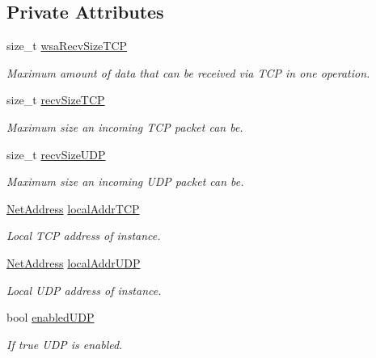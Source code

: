 \subsection*{Private Attributes}
\begin{DoxyCompactItemize}
\item 
size\_\-t \hyperlink{class_net_instance_profile_ad83ca6291444ecb7e1138f336952afc7}{wsaRecvSizeTCP}
\begin{DoxyCompactList}\small\item\em Maximum amount of data that can be received via TCP in one operation. \item\end{DoxyCompactList}\item 
size\_\-t \hyperlink{class_net_instance_profile_a399872e7c3f23fbee9f2283d1ac8fc04}{recvSizeTCP}
\begin{DoxyCompactList}\small\item\em Maximum size an incoming TCP packet can be. \item\end{DoxyCompactList}\item 
size\_\-t \hyperlink{class_net_instance_profile_ae24b078e006a395092d9256ab5947e95}{recvSizeUDP}
\begin{DoxyCompactList}\small\item\em Maximum size an incoming UDP packet can be. \item\end{DoxyCompactList}\item 
\hyperlink{class_net_address}{NetAddress} \hyperlink{class_net_instance_profile_ad8c7a728119a1e74e44fdbeb9dba3392}{localAddrTCP}
\begin{DoxyCompactList}\small\item\em Local TCP address of instance. \item\end{DoxyCompactList}\item 
\hyperlink{class_net_address}{NetAddress} \hyperlink{class_net_instance_profile_ad68155dc7f50c06688b8adae226626eb}{localAddrUDP}
\begin{DoxyCompactList}\small\item\em Local UDP address of instance. \item\end{DoxyCompactList}\item 
bool \hyperlink{class_net_instance_profile_add7906378b2fe3ebc0fed461b0e02395}{enabledUDP}
\begin{DoxyCompactList}\small\item\em If true UDP is enabled. \item\end{DoxyCompactList}\item 

\end{DoxyCompactItemize}
